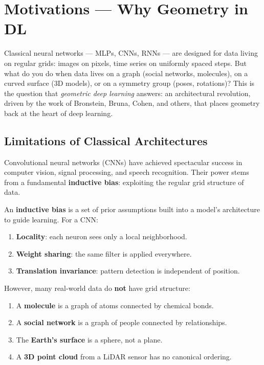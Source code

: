 \chapter{Motivations --- Why Geometry in DL}
\label{ch:motivations}

Classical neural networks --- MLPs, CNNs, RNNs --- are designed for data
living on regular grids: images on pixels, time series on uniformly spaced
steps. But what do you do when data lives on a graph (social networks,
molecules), on a curved surface (3D models), or on a symmetry group (poses,
rotations)? This is the question that \emph{geometric deep learning}
answers: an architectural revolution, driven by the work of Bronstein,
Bruna, Cohen, and others, that places geometry back at the heart of deep
learning.

\section{Limitations of Classical Architectures}

Convolutional neural networks (CNNs) have achieved spectacular success in
computer vision, signal processing, and speech recognition. Their power stems
from a fundamental \textbf{inductive bias}: exploiting the regular grid
structure of data.

\begin{definition}
An \textbf{inductive bias} is a set of prior assumptions built into a model's
architecture to guide learning. For a CNN:
\begin{enumerate}
    \item \textbf{Locality}: each neuron sees only a local neighborhood.
    \item \textbf{Weight sharing}: the same filter is applied everywhere.
    \item \textbf{Translation invariance}: pattern detection is independent of position.
\end{enumerate}
\end{definition}

However, many real-world data do \textbf{not} have grid structure:

\begin{example}
\begin{enumerate}
    \item A \textbf{molecule} is a graph of atoms connected by chemical bonds.
    \item A \textbf{social network} is a graph of people connected by relationships.
    \item The \textbf{Earth's surface} is a sphere, not a plane.
    \item A \textbf{3D point cloud} from a LiDAR sensor has no canonical ordering.
\end{enumerate}
\end{example}

